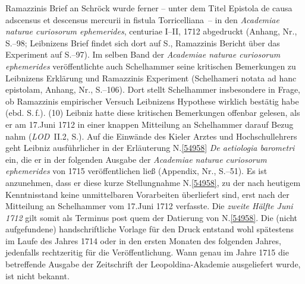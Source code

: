 Ramazzinis Brief an Schröck wurde ferner -- unter dem Titel \glqq Epistola de causa adscensus et descensus mercurii in fistula Torricelliana\grqq\ -- in den \textit{Academiae naturae curiosorum ephemerides}, centuriae I--II, 1712 abgedruckt (Anhang, Nr., S.--98;\cite{01457} Leibnizens Brief findet sich dort auf S.,\cite{01454} Ramazzinis Bericht über das Experiment auf S.--97).\cite{01460}
Im selben Band der \textit{Academiae naturae curiosorum ephemerides} veröffentlichte auch Schelhammer seine kritischen Bemerkungen zu Leibnizens Erklärung und Ramazzinis Experiment (\glqq Schelhameri notata ad hanc epistolam\grqq, Anhang, Nr., S.--106).\cite{01461}\cite{01457}
Dort stellt Schelhammer insbesondere in Frage, ob Ramazzinis empirischer Versuch Leibnizens Hypothese wirklich bestätig habe (ebd. S.\,f.).\cite{01461}\cite{01457}%
%
\pend%
\pstart%
(10)
Leibniz hatte diese kritischen Bemerkungen offenbar gelesen, als er am 17.\;Juni 1712 in einer knappen Mitteilung an Schelhammer darauf Bezug nahm (\textit{LOD}~II.2, S.).\cite{01463}
Auf die Einwände des Kieler Arztes und Hochschullehrers geht Leibniz ausführlicher in der Erläuterung N.\;\ref{54958} \textit{De aetiologia barometri} ein, die er in der folgenden Ausgabe der \textit{Academiae naturae curiosorum ephemerides} von 1715 veröffentlichen ließ (Appendix, Nr., S.--51).\cite{01457}\cite{01458}
Es ist anzunehmen, dass er diese kurze Stellungnahme N.\;\ref{54958}, zu der nach heutigem Kenntnisstand keine unmittelbaren Vorarbeiten überliefert sind, erst nach der Mitteilung an Schelhammer vom 17.\;Juni 1712 verfasste.
Die \textit{zweite Hälfte Juni 1712} gilt somit als Terminus post quem der Datierung von N.\;\ref{54958}.
Die (nicht aufgefundene) handschriftliche Vorlage für den Druck entstand wohl spätestens im Laufe des Jahres 1714 oder in den ersten Monaten des folgenden Jahres, jedenfalls rechtzeritig für die Veröffentlichung.
Wann genau im Jahre 1715 die betreffende Ausgabe der Zeitschrift der Leopoldina-Akademie ausgeliefert wurde, ist nicht bekannt.
